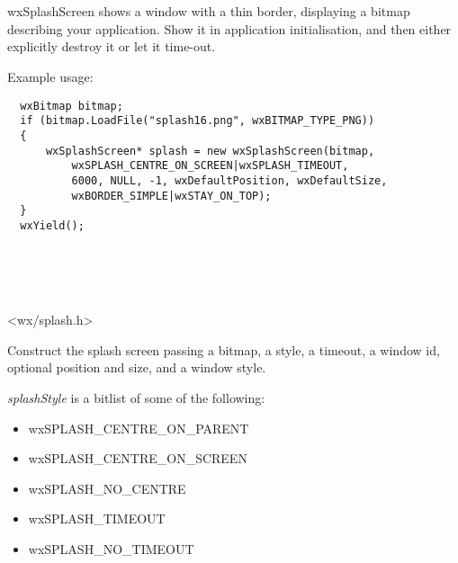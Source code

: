 \section{}\label{wxsplashscreen}

wxSplashScreen shows a window with a thin border, displaying a bitmap describing your
application. Show it in application initialisation, and then either explicitly destroy
it or let it time-out.

Example usage:

\begin{verbatim}
  wxBitmap bitmap;
  if (bitmap.LoadFile("splash16.png", wxBITMAP_TYPE_PNG))
  {
      wxSplashScreen* splash = new wxSplashScreen(bitmap,
          wxSPLASH_CENTRE_ON_SCREEN|wxSPLASH_TIMEOUT,
          6000, NULL, -1, wxDefaultPosition, wxDefaultSize,
          wxBORDER_SIMPLE|wxSTAY_ON_TOP);
  }
  wxYield();
\end{verbatim}


\\
\\
\\


<wx/splash.h>




\label{wxsplashscreenwxsplashscreen}


Construct the splash screen passing a bitmap, a style, a timeout, a window id, optional position
and size, and a window style.

{\it splashStyle} is a bitlist of some of the following:

\begin{itemize}\itemsep=0pt
\item wxSPLASH\_CENTRE\_ON\_PARENT
\item wxSPLASH\_CENTRE\_ON\_SCREEN
\item wxSPLASH\_NO\_CENTRE
\item wxSPLASH\_TIMEOUT
\item wxSPLASH\_NO\_TIMEOUT
\end{itemize}

